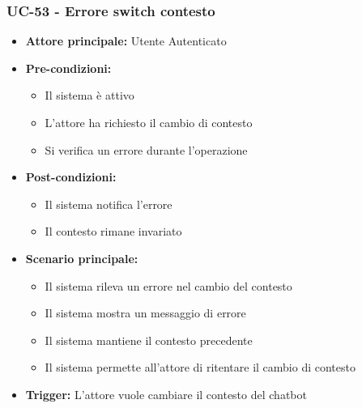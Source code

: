 \documentclass[a4paper,12pt]{article}
\newcommand{\ignoreglossary}{}
\begin{document}
\subsubsection{UC-53 - Errore switch contesto} \label{sec:UC-53}
\begin{itemize}
    \item \textbf{Attore principale:} Utente Autenticato
    \item \textbf{Pre-condizioni:}
    \begin{itemize}
        \item Il sistema è attivo
        \item L'attore ha richiesto il cambio di contesto
        \item Si \ignoreglossary{verifica} un errore durante l'operazione
    \end{itemize}
    \item \textbf{Post-condizioni:}
    \begin{itemize}
        \item Il sistema notifica l'errore
        \item Il contesto rimane invariato
    \end{itemize}
    \item \textbf{Scenario principale:}
    \begin{itemize}
        \item Il sistema rileva un errore nel cambio del contesto
        \item Il sistema mostra un messaggio di errore
        \item Il sistema mantiene il contesto precedente
        \item Il sistema permette all'attore di ritentare il cambio di contesto
    \end{itemize}
    \item \textbf{Trigger:} L'attore vuole cambiare il contesto del chatbot
\end{itemize}
\end{document}
